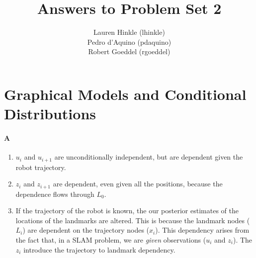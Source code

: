 \documentclass[12pt]{article}
\title{Answers to Problem Set 2}
\author{
	Lauren Hinkle (lhinkle)\\
	Pedro d'Aquino (pdaquino)\\
	Robert Goeddel (rgoeddel)}
\begin{document}
\maketitle
\pagebreak

\section{Graphical Models and Conditional Distributions}

\paragraph{A}
\begin{enumerate}
	\item $u_i$ and $u_{i+1}$ are unconditionally independent, but are dependent given the robot trajectory.
	\item $z_i$ and $z_{i+1}$ are dependent, even given all the positions, because the dependence flows through $L_0$.
	\item If the trajectory of the robot is known, the our posterior estimates of the locations of the landmarks
    are altered. This is because the landmark nodes ($L_i$) are dependent on the trajectory nodes ($x_i$). This
    dependency arises from the fact that, in a SLAM problem, we are \emph{given} observations ($u_i$ and $z_i$).
    The $z_i$ introduce the trajectory to landmark dependency.
\end{enumerate}
\end{document}
